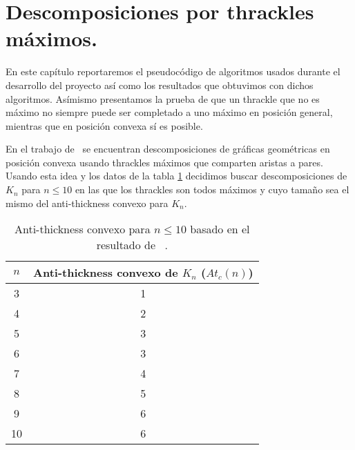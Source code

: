 \section{Descomposiciones por thrackles máximos.}

En este capítulo reportaremos el pseudocódigo de algoritmos usados durante el desarrollo
del proyecto así como los resultados que obtuvimos con dichos algoritmos.
Asímismo presentamos la prueba de que un thrackle que no es máximo no siempre
puede ser completado a uno máximo en posición general, mientras que en posición
convexa sí es posible.

En el trabajo de~\cite{Fabila-Monroy2018} se encuentran descomposiciones de gráficas
geométricas en posición convexa usando thrackles máximos que comparten aristas a pares.
Usando esta idea y los datos de la tabla \ref{table:atconvexo} decidimos
buscar descomposiciones de $K_n$ para $n \leq 10$ en las que los thrackles
son todos máximos y cuyo tamaño sea el mismo del anti-thickness convexo para $K_n$.

\begin{table}[t]
  \centering
  \begin{tabular}{|c|c|}
    \hline
    $n$ & Anti-thickness convexo de $K_n$ ($At_c(n)$) \\ \hline\hline
    3   & 1  \\
    4   & 2  \\
    5   & 3  \\
    6   & 3  \\
    7   & 4  \\
    8   & 5  \\
    9   & 6  \\
    10  & 6  \\ \hline
  \end{tabular}
  \caption{ Anti-thickness convexo para $n\leq 10$ basado en el resultado de ~\cite{Fabila-Monroy2018}.}
  \label{table:atconvexo}
\end{table}

